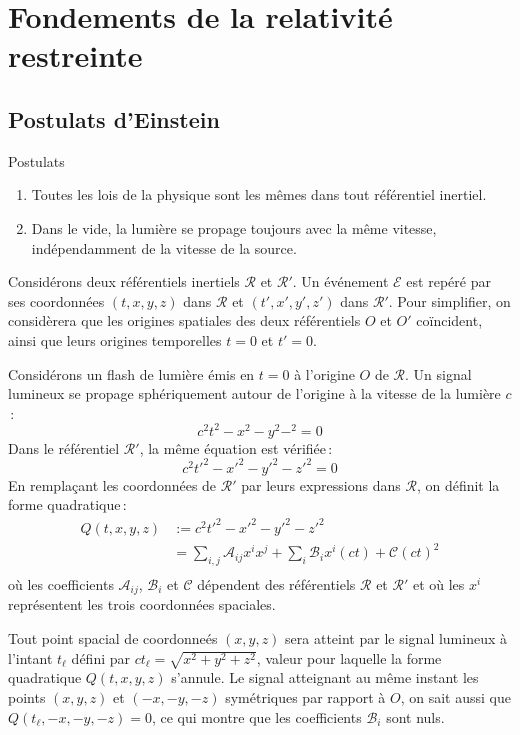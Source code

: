 \section{Fondements de la relativité restreinte}

    \subsection{Postulats d’Einstein}

    \begin{omed}{Postulats}
        \begin{enumerate}
            \item Toutes les lois de la physique sont les mêmes dans tout référentiel inertiel.
            \item Dans le vide, la lumière se propage toujours avec la même vitesse, indépendamment de la vitesse de la source.
        \end{enumerate}
    \end{omed}

    Considérons deux référentiels inertiels $\mathcal{R}$ et $\mathcal{R}'$. Un événement $\mathcal{E}$ est repéré par ses coordonnées $(t,x,y,z)$ dans $\mathcal{R}$ et $(t', x', y', z')$ dans $\mathcal{R}'$. Pour simplifier, on considèrera que les origines spatiales des deux référentiels $O$ et $O'$ coïncident, ainsi que leurs origines temporelles $t = 0$ et $t' = 0$.

    Considérons un flash de lumière émis en $t = 0$ à l’origine $O$ de $\mathcal{R}$. Un signal lumineux se propage sphériquement autour de l’origine à la vitesse de la lumière $c$ :
    \[ c^2 t^2 - x^2 - y^2 - ^2 = 0 \]   
    Dans le référentiel $\mathcal{R}'$, la même équation est vérifiée :
    \[ c^2 t'^2 - x'^2 - y'^2 - z'^2 = 0 \]
    En remplaçant les coordonnées de $\mathcal{R}'$ par leurs expressions dans $\mathcal{R}$, on définit la forme quadratique :
    \begin{align*}
        Q(t,x,y,z) 
        &:= c^2 t'^2 - x'^2 - y'^2 - z'^2 \\
        &= \sum_{i,j} \mathcal{A}_{ij} x^i x^j + \sum_{i} \mathcal{B}_{i} x^i(ct) + \mathcal{C} (ct)^2 \\
    \end{align*}
    où les coefficients $\mathcal{A}_{ij}$, $\mathcal{B}_i$ et $\mathcal{C}$ dépendent des référentiels $\mathcal{R}$ et $\mathcal{R}'$ et où les $x^i$ représentent les trois coordonnées spaciales.

    Tout point spacial de coordonneés $(x,y,z)$ sera atteint par le signal lumineux à l’intant $t_{\ell}$ défini par $ct_{\ell} = \sqrt{x^2 + y^2 + z^2}$, valeur pour laquelle la forme quadratique $Q(t,x,y,z)$ s’annule. Le signal atteignant au même instant les points $(x,y,z)$ et $(-x,-y,-z)$ symétriques par rapport à $O$, on sait aussi que $Q(t_{\ell}, -x, -y, -z) = 0$, ce qui montre que les coefficients $\mathcal{B}_i$ sont nuls.

